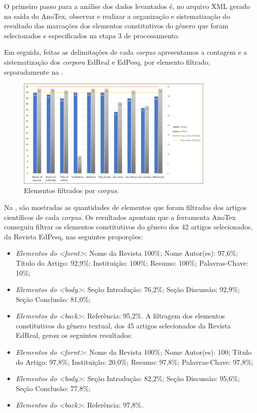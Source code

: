 \documentclass[portuguese]{textolivre}
\begin{document}
O primeiro passo para a análise dos dados levantados é, no arquivo XML gerado na saída do AnoTex, observar e realizar a organização e sistematização do resultado das marcações dos elementos constitutivos do gênero que foram selecionados e especificados na etapa 3 de processamento.

Em seguida, feitas as delimitações de cada \textit{corpus} apresentamos a contagem e a sistematização dos \textit{corpora} EdReal e EdPesq, por elemento filtrado, separadamente na .

\begin{figure}[htbp]
 \centering
 \includegraphics[width=0.85\textwidth]{Fig6.png}
 \caption{Elementos filtrados por \textit{corpus}.}
 \label{fig-06}
\end{figure}

Na , são mostradas as quantidades de elementos que foram filtradas dos artigos científicos de cada \textit{corpus}. Os resultados apontam que a ferramenta AnoTex conseguiu filtrar os elementos constitutivos do gênero dos 42 artigos selecionados, da Revista EdPesq, nas seguintes proporções:

\begin{itemize}
    \item \textit{Elementos do <fornt>}: Nome da Revista 100\%; Nome Autor(es): 97,6\%; Título do Artigo: 92,9\%; Instituição: 100\%; Resumo: 100\%; Palavras-Chave: 10\%;
    \item \textit{Elementos do <body>}: Seção Introdução: 76,2\%; Seção Discussão: 92,9\%; Seção Conclusão: 81,0\%;
    \item \textit{Elementos do <back>}: Referência: 95,2\%. A filtragem dos elementos constitutivos do gênero textual, dos 45 artigos selecionados da Revista EdReal, gerou os seguintes resultados:
    \item \textit{Elementos do <fornt>}: Nome da Revista 100\%; Nome Autor(es): 100; Título do Artigo: 97,8\%; Instituição: 20,0\%; Resumo: 97,8\%; Palavras-Chave: 97,8\%;
    \item \textit{Elementos do <body>}: Seção Introdução: 82,2\%; Seção Discussão: 95,6\%; Seção Conclusão: 77,8\%;
    \item \textit{Elementos do <back>}: Referência: 97,8\%.
\end{itemize}
\end{document}
